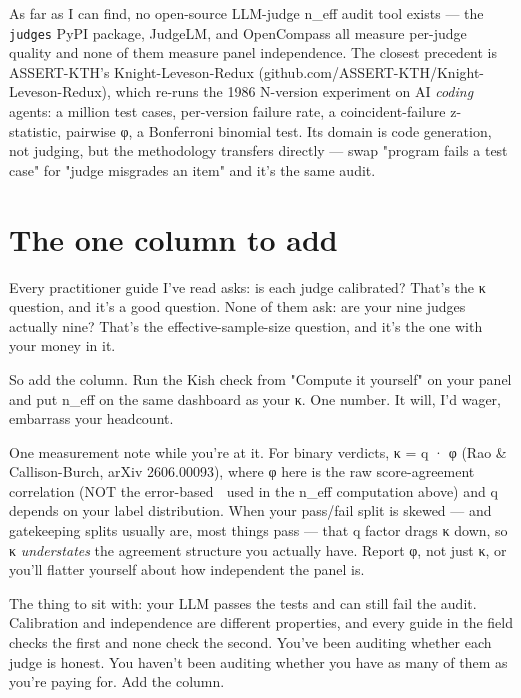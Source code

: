 \documentclass[11pt]{article}
\begin{document}
As far as I can find, no open-source LLM-judge n\_eff audit tool exists — the \texttt{judges} PyPI package, JudgeLM, and OpenCompass all measure per-judge quality and none of them measure panel independence. The closest precedent is ASSERT-KTH's Knight-Leveson-Redux (github.com/ASSERT-KTH/Knight-Leveson-Redux), which re-runs the 1986 N-version experiment on AI \emph{coding} agents: a million test cases, per-version failure rate, a coincident-failure z-statistic, pairwise φ, a Bonferroni binomial test. Its domain is code generation, not judging, but the methodology transfers directly — swap "program fails a test case" for "judge misgrades an item" and it's the same audit.

\section*{The one column to add}

Every practitioner guide I've read asks: is each judge calibrated? That's the κ question, and it's a good question. None of them ask: are your nine judges actually nine? That's the effective-sample-size question, and it's the one with your money in it.

So add the column. Run the Kish check from "Compute it yourself" on your panel and put n\_eff on the same dashboard as your κ. One number. It will, I'd wager, embarrass your headcount.

One measurement note while you're at it. For binary verdicts, κ = q · φ (Rao \& Callison-Burch, arXiv 2606.00093), where φ here is the raw score-agreement correlation (NOT the error-based  used in the n\_eff computation above) and q depends on your label distribution. When your pass/fail split is skewed — and gatekeeping splits usually are, most things pass — that q factor drags κ down, so κ \emph{understates} the agreement structure you actually have. Report φ, not just κ, or you'll flatter yourself about how independent the panel is.

The thing to sit with: your LLM passes the tests and can still fail the audit. Calibration and independence are different properties, and every guide in the field checks the first and none check the second. You've been auditing whether each judge is honest. You haven't been auditing whether you have as many of them as you're paying for. Add the column.
\end{document}
